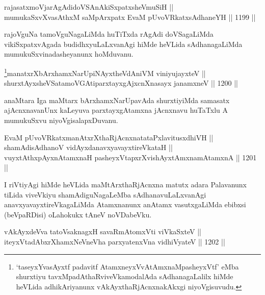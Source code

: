 
\begin{shl}
rajasatxmoVjarAgAdidoVSAnAkiSxpatxsheVmuSiH || \\
mumukaSxvXvasAthxM saMpArxpatx EvaM pUvoVRkatxsAdhaneYH \hfill || 1199 ||  
\end{shl}

\begin{artha}
rajoVguNa tamoVguNagaLiMda huTiTxda rAgAdi doVSagaLiMda vikiSxpatxvAgada budidhxyuLaLxvanAgi hiMde heVLida sAdhanagaLiMda mumukuSxvinadasheyanunx hoMduvanu.
\end{artha}



\begin{shl}
\footnote{`taseyxYvasAyxtf padavitf AtamxneyxVvA\s\s tAmxnaMpasheyxVtf' eMba shurxtiyu tavxMpadAthaRviveVkamodalAda sAdhanagaLalilx hiMde heVLida adhikAriyanunx vAkAyxthaRjAcnxnakAkxgi niyoVgisuvudu.}manatxrXbArxhamxNarUpiNAyx\s theVdAniVM viniyujayxteV || \\
shurxtAyx\s sheVSatamoVGAtiparxtayxgAjxcnXnasayx janamxneV \hfill || 1200 ||  
\end{shl}

\begin{artha}
anaMtara Iga maMtarx bArxhamxNarUpavAda shurxtiyiMda samasatx ajAcnxnavanUnx kaLeyuva parxtayxgAtamxna jAcnxnavu huTaTxlu A mumukuSxvu niyoVgisalapxDuvanu.
\end{artha}


\begin{shl}
EvaM pUvoVRkatxmanAtxrXthaRjAcnxnatataPxlavitusxdhiVH || \\
shamAdisAdhanoV vidAyxdanavxyavayxtireVkataH || \\
vuyxtAthxpAyxnAtamxnaH pasheyxVtapxrXvishAyx\s \s tAmxnamAtamxnA \hfill || 1201 || 
\end{shl} 

\begin{artha}
I riVtiyAgi hiMde heVLida maMtArxthaRjAcnxna matutx adara Palavanunx tiLida viveVkiyu shamAdiguNagaLeMba sAdhanavuLaLxvanAgi anavxyavayxtireVkagaLiMda Atamxnanunx anAtamx vasutxgaLiMda ebibxsi (beVpaRDisi) oLahokukx tAneV noVDabeVku.
\end{artha}

\begin{shl}
vAkAyxdeVva tatoV\s saknagxH savaRmAtomxVti viVkaSxteV || \\
iteyxVtadAbxrXhamxNeVneVha parxyatenxVna vidhiVyateV \hfill || 1202 ||  
\end{shl}

